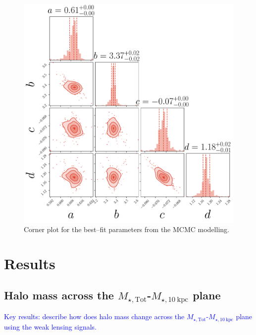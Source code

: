 \documentclass[a4paper,fleqn,usenatbib]{mnras}
\def\mtot{{$M_{\star,\mathrm{Tot}}$}}
\def\minn{{$M_{\star,10\ \mathrm{kpc}}$}}
\newcommand{\plan}[1]{\textcolor{blue}{#1}}
\begin{document}
    \begin{figure}
        \centering 
        \includegraphics[width=\columnwidth]{fig/um2_model_A_corner}
            \caption{
                Corner plot for the best--fit parameters from the MCMC modelling.
                }
        \label{fig:um2_m100_m10_1}
    \end{figure}

\section{Results}
    \label{sec:result}

\subsection{Halo mass across the \mtot{}-\minn{} plane}
    \label{ssec:mhalo_wl}
    
    \plan{Key results: describe how does halo mass change across the \mtot{}-\minn{} 
          plane using the weak lensing signals.}
\end{document}
